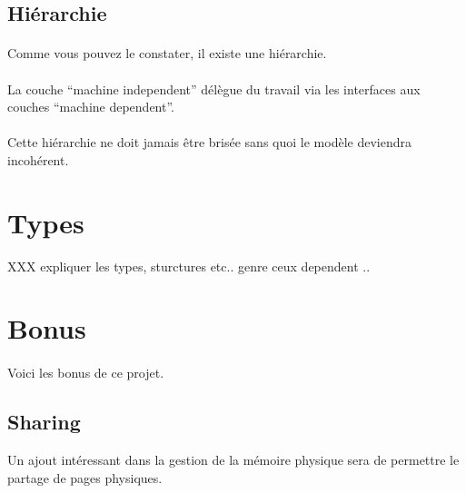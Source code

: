 \documentclass[10pt,a4wide]{article}
\begin{document}
\subsection{Hi\'erarchie}

\paragraph{}

Comme vous pouvez le constater, il existe une hi\'erarchie.

\paragraph{}

La couche ``machine independent'' d\'el\`egue du travail via les interfaces
aux couches ``machine dependent''.

\paragraph{}

Cette hi\'erarchie ne doit jamais \^etre bris\'ee sans quoi le mod\`ele
deviendra incoh\'erent.

\section{Types}

XXX expliquer les types, sturctures etc.. genre ceux dependent ..

\section{Bonus}

\paragraph{}

Voici les bonus de ce projet.

\subsection{Sharing}

Un ajout int\'eressant dans la gestion de la m\'emoire physique sera
de permettre le partage de pages physiques.

\paragraph{}
\end{document}
